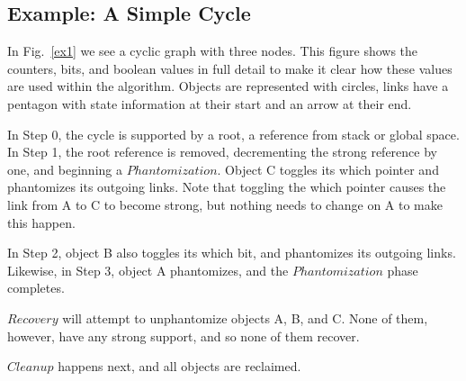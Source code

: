 \subsection{Example: A Simple Cycle}

In Fig.~\ref{ex1} we see a cyclic graph with three nodes. This figure shows
the counters, bits, and boolean values in full detail to make it clear how
these values are used within the algorithm. Objects are represented with
circles, links have a pentagon with state information at their start and
an arrow at their end.

In Step 0, the cycle is supported by a root, a reference from stack or global
space. In Step 1, the root reference is removed, decrementing the strong
reference by one, and beginning a $Phantomization$. Object C toggles its which pointer and
phantomizes its outgoing links. Note that toggling the which pointer causes the
link from A to C to become strong, but nothing needs to change on A
to make this happen.

In Step 2, object B also toggles its which bit, and phantomizes its
outgoing links. Likewise, in Step 3, object A phantomizes, and the
$Phantomization$ phase completes.

$Recovery$ will attempt to unphantomize objects A, B, and C. None of them,
however, have any strong support, and so none of them recover.

$Cleanup$ happens next, and all objects are reclaimed.



